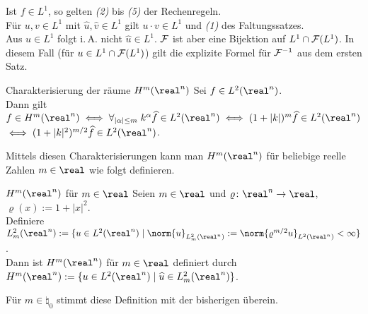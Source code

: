 \begin{Bem}
    Ist $f \in L^1$, so gelten \emph{(2)} bis \emph{(5)} der Rechenregeln.\\
    Für $u, v \in L^1$ mit $\widehat{u}, \widehat{v} \in L^1$ gilt $u \cdot v \in L^1$ und
    \emph{(1)} des Faltungssatzes.\\
    Aus $u \in L^1$ folgt i.\,A. nicht $\widehat{u} \in L^1$.
    $\mathcal{F}$ ist aber eine Bijektion auf $L^1 \cap \mathcal{F}(L^1)$.
    In diesem Fall (für $u \in L^1 \cap \mathcal{F}(L^1)$)
    gilt die explizite Formel für $\mathcal{F}^{-1}$ aus dem ersten Satz.
\end{Bem}

\linie

\begin{Satz}{Charakterisierung der räume $H^m(\real^n)$}
    Sei $f \in L^2(\real^n)$.\\
    Dann gilt $f \in H^m(\real^n)
    \iff \forall_{|\alpha| \le m}\; k^\alpha \widehat{f} \in L^2(\real^n)
    \iff (1 + |k|)^m \widehat{f} \in L^2(\real^n)$\\
    $\iff (1 + |k|^2)^{m/2} \widehat{f} \in L^2(\real^n)$.
\end{Satz}

\begin{Bem}
    Mittels diesen Charakterisierungen kann man $H^m(\real^n)$ für beliebige reelle Zahlen
    $m \in \real$ wie folgt definieren.
\end{Bem}

\begin{Def}{$H^m(\real^n)$ für $m \in \real$}
    Seien $m \in \real$ und $\varrho\colon \real^n \rightarrow \real$, $\varrho(x) := 1 + |x|^2$.\\
    Definiere $L^2_m(\real^n) := \{u \in L^2(\real^n) \;|\;
    \norm{u}_{L^2_m(\real^n)} := \norm{\varrho^{m/2} u}_{L^2(\real^n)} < \infty\}$.\\
    Dann ist $H^m(\real^n)$ für $m \in \real$ definiert durch
    $H^m(\real^n) := \{u \in L^2(\real^n) \;|\; \widehat{u} \in L^2_m(\real^n)\}$.
\end{Def}

\begin{Bem}
    Für $m \in \natural_0$ stimmt diese Definition mit der bisherigen überein.
\end{Bem}

\linie


